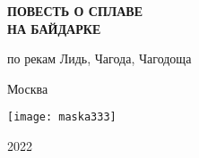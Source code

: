 \begin{titlepage}
	\newpage
	\begin{center}
		\Large \textbf \MyVarAuthorName
	\end{center}	
	\vspace{3cm}	
	\begin{center}
	\end{center}
	\begin{center}
		\LARGE\textbf{ПОВЕСТЬ О СПЛАВЕ\\НА БАЙДАРКЕ}
	\end{center}	
	\begin{center}
	\end{center}
	\begin{center}
		\Large {по рекам Лидь, Чагода, Чагодоща}
	\end{center}
	\begin{center}
	\end{center}
	\vspace{\fill}	
	\begin{center}\normalsize Москва\end{center}
	\vspace{-1.15cm}
	\begin{center}\texttt{[image: maska333]}\end{center}
	\vspace{-1.32cm}
	\begin{center}\normalsize 2022\end{center}
\end{titlepage}
